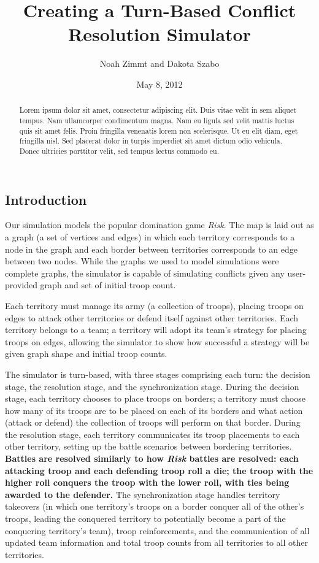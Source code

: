 \documentclass[10pt]{article}
\title{
	\textbf{
		Creating a Turn-Based Conflict Resolution Simulator
	}
}
\author{Noah Zimmt and Dakota Szabo}
\date{May 8, 2012}
\begin{document}
	\maketitle
	\begin{abstract}
		Lorem ipsum dolor sit amet, consectetur adipiscing elit. Duis vitae velit in sem aliquet tempus. Nam ullamcorper condimentum magna. Nam eu ligula sed velit mattis luctus quis sit amet felis. Proin fringilla venenatis lorem non scelerisque. Ut eu elit diam, eget fringilla nisl. Sed placerat dolor in turpis imperdiet sit amet dictum odio vehicula. Donec ultricies porttitor velit, sed tempus lectus commodo eu.
	\end{abstract}

	\begin{multicols}{2}
		\section*{Introduction}
		
		Our simulation models the popular domination game \emph{Risk}. The map is laid out as a graph (a set of vertices and edges) in which each territory corresponds to a node in the graph and each border between territories corresponds to an edge between two nodes. While the graphs we used to model simulations were complete graphs, the simulator is capable of simulating conflicts given any user-provided graph and set of initial troop count.  

		Each territory must manage its army (a collection of troops), placing troops on edges to attack other territories or defend itself against other territories. Each territory belongs to a team; a territory will adopt its team's strategy for placing troops on edges, allowing the simulator to show how successful a strategy will be given graph shape and initial troop counts.

		The simulator is turn-based, with three stages comprising each turn: the decision stage, the resolution stage, and the synchronization stage. During the decision stage, each territory chooses to place troops on borders; a territory must choose how many of its troops are to be placed on each of its borders and what action (attack or defend) the collection of troops will perform on that border. During the resolution stage, each territory communicates its troop placements to each other territory, setting up the battle scenarios between bordering territories.  \textbf{Battles are resolved similarly to how \emph{Risk} battles are resolved: each attacking troop and each defending troop roll a die; the troop with the higher roll conquers the troop with the lower roll, with ties being awarded to the defender.} The synchronization stage handles territory takeovers (in which one territory's troops on a border conquer all of the other's troops, leading the conquered territory to potentially become a part of the conquering territory's team), troop reinforcements, and the communication of all updated team information and total troop counts from all territories to all other territories.


\end{multicols}
\end{document}
